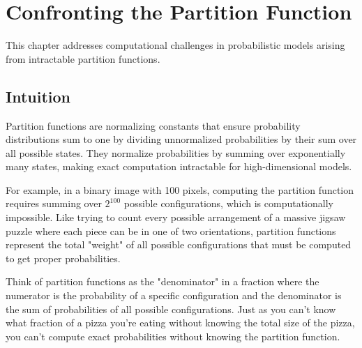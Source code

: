 
\chapter{Confronting the Partition Function}
\label{chap:partition-function}

This chapter addresses computational challenges in probabilistic models arising from intractable partition functions.


\begin{learningobjectives}
\end{learningobjectives}



\section*{Intuition}

Partition functions are normalizing constants that ensure probability distributions sum to one by dividing unnormalized probabilities by their sum over all possible states. They normalize probabilities by summing over exponentially many states, making exact computation intractable for high-dimensional models.

For example, in a binary image with 100 pixels, computing the partition function requires summing over $2^{100}$ possible configurations, which is computationally impossible. Like trying to count every possible arrangement of a massive jigsaw puzzle where each piece can be in one of two orientations, partition functions represent the total "weight" of all possible configurations that must be computed to get proper probabilities.

Think of partition functions as the "denominator" in a fraction where the numerator is the probability of a specific configuration and the denominator is the sum of probabilities of all possible configurations. Just as you can't know what fraction of a pizza you're eating without knowing the total size of the pizza, you can't compute exact probabilities without knowing the partition function.











